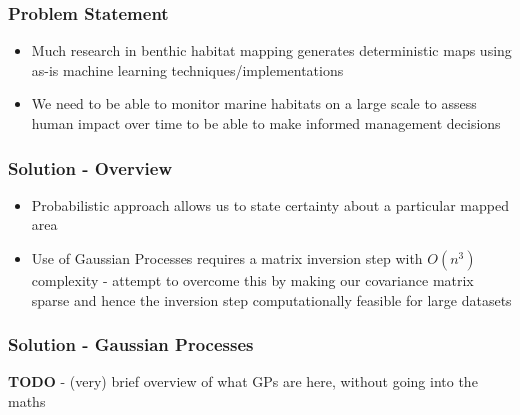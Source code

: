 \documentclass{beamer}
\begin{document}
\begin{frame}
    \frametitle{Problem Statement}
    \begin{itemize}
        \item Much research in benthic habitat mapping generates deterministic maps using as-is machine learning techniques/implementations
        \item We need to be able to monitor marine habitats on a large scale to assess human impact over time to be able to make informed management decisions
    \end{itemize}
\end{frame}

\begin{frame}
    \frametitle{Solution - Overview}
    \begin{itemize}
            
        \item Probabilistic approach allows us to state certainty about a particular mapped area
        \item Use of Gaussian Processes requires a matrix inversion step with $O(n^3)$ complexity - attempt to overcome this by making our covariance matrix sparse and hence the inversion step computationally feasible for large datasets
    \end{itemize}
\end{frame}

\begin{frame}
    \frametitle{Solution - Gaussian Processes}
    \textbf{TODO} - (very) brief overview of what GPs are here, without going into the maths
\end{frame}
\end{document}
